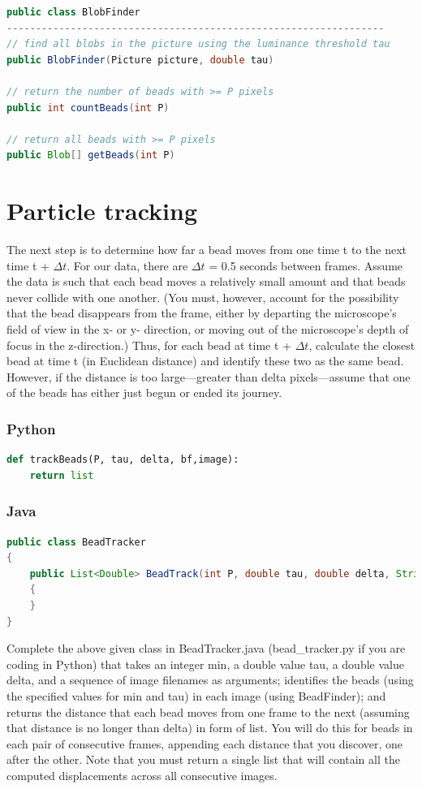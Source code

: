 \documentclass[]{article}
\begin{document}
\begin{lstlisting}[language=Java]
public class BlobFinder
-----------------------------------------------------------------
// find all blobs in the picture using the luminance threshold tau
public BlobFinder(Picture picture, double tau)

// return the number of beads with >= P pixels
public int countBeads(int P)

// return all beads with >= P pixels
public Blob[] getBeads(int P)

\end{lstlisting}
\section{Particle tracking}
The next step is to determine how far a bead moves from one time t to the next time t + $\Delta t$. For our data, there are $\Delta t$ = 0.5 seconds between frames. Assume the data is such that each bead moves a relatively small amount and that beads never collide with one another. (You must, however, account for the possibility that the bead disappears from the frame, either by departing the microscope's field of view in the x- or y- direction, or moving out of the microscope's depth of focus in the z-direction.) Thus, for each bead at time t + $\Delta t$, calculate the closest bead at time t (in Euclidean distance) and identify these two as the same bead. However, if the distance is too large—greater than delta pixels—assume that one of the beads has either just begun or ended its journey.

\subsubsection{Python}
\begin{lstlisting}[language=Python]
def trackBeads(P, tau, delta, bf,image):
    return list
\end{lstlisting}

\subsubsection{Java}
\begin{lstlisting}[language=Java]
public class BeadTracker 
{
    public List<Double> BeadTrack(int P, double tau, double delta, String[] image) 
    {
    }
}
\end{lstlisting}

Complete the above given class in BeadTracker.java (bead\_tracker.py if you are coding in Python) that takes an integer min, a double value tau, a double value delta, and a sequence of image filenames as arguments; identifies the beads (using the specified values for min and tau) in each image (using BeadFinder); and returns the distance that each bead moves from one frame to the next (assuming that distance is no longer than delta) in form of list. You will do this for beads in each pair of consecutive frames, appending each distance that you discover, one after the other. Note that you must return a single list that will contain all the computed displacements across all consecutive images.
\end{document}
